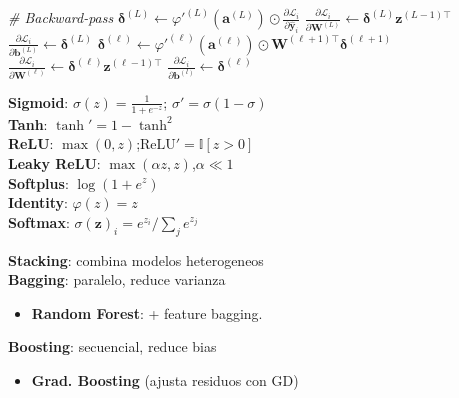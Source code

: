 \documentclass[11pt, a4paper]{article}
\newcommand{\y}{\mathbf{y}}
\newcommand{\z}{\mathbf{z}}
\newcommand{\bias}{\mathbf{b}}
\newcommand{\preact}{\mathbf{a}}
\newcommand{\W}{\mathbf{W}}
\newcommand{\Loss}{\mathcal{L}}
\begin{document}
\begin{minipage}[t]{0.325\textwidth}
\begin{tcolorbox}[formulabox=Multi-layer Perceptron (MLP), colframe=softRed]
\begin{algorithmic}[0]
            \Statex \textit{\# Backward-pass}
            \State $\boldsymbol{\delta}^{(L)} \leftarrow \varphi'^{(L)}(\preact^{(L)}) \odot \frac{\partial \Loss_i}{\partial \hat{\y}_i}$
            \State $\frac{\partial \Loss_i}{\partial \W^{(L)}} \leftarrow \boldsymbol{\delta}^{(L)} \z^{(L-1)\top}$
            \State $\frac{\partial \Loss_i}{\partial \bias^{(L)}} \leftarrow \boldsymbol{\delta}^{(L)}$
                \State $\boldsymbol{\delta}^{(\ell)} \leftarrow \varphi'^{(\ell)}(\preact^{(\ell)}) \odot \W^{(\ell+1)\top}\boldsymbol{\delta}^{(\ell+1)}$
                \State $\frac{\partial \Loss_i}{\partial \W^{(\ell)}} \leftarrow \boldsymbol{\delta}^{(\ell)} \z^{(\ell-1)\top}$
                \State $\frac{\partial \Loss_i}{\partial \bias^{(l)}} \leftarrow \boldsymbol{\delta}^{(\ell)}$
            \EndFor
        \end{algorithmic}
    \end{tcolorbox}
    \begin{tcolorbox}[formulabox=Activation Functions $(\varphi)$, colframe=softPurple]
        \textbf{Sigmoid}: $\sigma(z)=\frac{1}{1+e^{-z}}$; \quad $\sigma'=\sigma(1-\sigma)$\\
        \textbf{Tanh}: $\tanh'=1-\tanh^2$\\
        \textbf{ReLU}: $\max(0,z)$;\quad $\text{ReLU}'=\mathbb{I}[z>0]$\\
        \textbf{Leaky ReLU}: $\max(\alpha z, z)$,\quad $\alpha\ll 1$\\
        \textbf{Softplus}: $\log(1+e^z)$\\
        \textbf{Identity}: $\varphi(z)=z$ \\
        \textbf{Softmax}: $\sigma(\z)_i = e^{z_i}/\sum_j e^{z_j}$
    \end{tcolorbox}
    \begin{tcolorbox}[formulabox=Ensemble Methods, colframe=softSlate]
        \textbf{Stacking}: combina modelos heterogeneos \\
        \textbf{Bagging}: paralelo, reduce varianza
        \begin{itemize}
            \item \textbf{Random Forest}: + feature bagging.
        \end{itemize}
        \textbf{Boosting}: secuencial, reduce bias
        \begin{itemize}
            \item \textbf{Grad. Boosting} (ajusta residuos con GD)

\end{itemize}
\end{tcolorbox}
\end{minipage}
\end{document}
